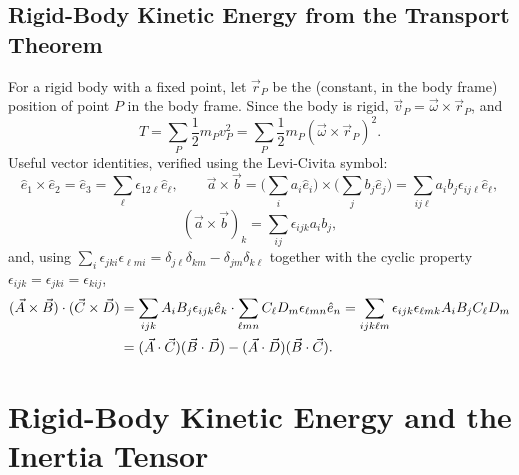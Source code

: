\documentclass[11pt]{article}
\begin{document}
\subsection{Rigid-Body Kinetic Energy from the Transport Theorem}

For a rigid body with a fixed point, let $\vec r_P$ be the (constant, in the body frame) position of point $P$ in the body frame. Since the body is rigid, $\vec v_P=\vec\omega\times\vec r_P$, and
\begin{equation}
T = \sum_P \frac12 m_P v_P^2 = \sum_P \frac12 m_P\left(\vec\omega\times\vec r_P\right)^2.
\label{eq:T-rigid-fixed}
\end{equation}
Useful vector identities, verified using the Levi-Civita symbol:
\begin{equation}
\hat e_1\times\hat e_2=\hat e_3=\sum_\ell\epsilon_{12\ell}\hat e_\ell, \qquad
\vec a\times\vec b = \Big(\sum_i a_i\hat e_i\Big)\times\Big(\sum_j b_j\hat e_j\Big) = \sum_{ij\ell}a_ib_j\epsilon_{ij\ell}\hat e_\ell,
\label{eq:axb-component}
\end{equation}
\begin{equation}
(\vec a\times\vec b)_k=\sum_{ij}\epsilon_{ijk}a_ib_j,
\label{eq:axb-component-k}
\end{equation}
and, using $\sum_i \epsilon_{jki}\epsilon_{\ell mi}=\delta_{j\ell}\delta_{km}-\delta_{jm}\delta_{k\ell}$ together with the cyclic property $\epsilon_{ijk}=\epsilon_{jki}=\epsilon_{kij}$,
\begin{align}
(\vec A\times\vec B)\cdot(\vec C\times\vec D) &= \sum_{ijk}A_iB_j\epsilon_{ijk}\hat e_k \cdot \sum_{\ell m n}C_\ell D_m\epsilon_{\ell mn}\hat e_n
= \sum_{ijk\ell m}\epsilon_{ijk}\epsilon_{\ell mk}A_iB_jC_\ell D_m\notag\\
&= (\vec A\cdot\vec C)(\vec B\cdot\vec D)-(\vec A\cdot\vec D)(\vec B\cdot\vec C).
\label{eq:bac-cab}
\end{align}

\section{Rigid-Body Kinetic Energy and the Inertia Tensor}
\end{document}
